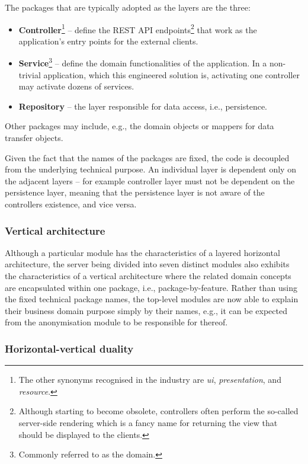 \documentclass[a4paper,twoside,12pt]{book}
\begin{document}
The packages that are typically adopted as the layers are the three:
\begin{itemize}
\item \textbf{Controller}\footnote{The other synonyms recognised in the industry are \textit{ui}, \textit{presentation}, and \textit{resource}.} -- define the REST API endpoints\footnote{Although starting to become obsolete, controllers often perform the so-called server-side rendering which is a fancy name for returning the view that should be displayed to the clients.} that work as the application's entry points for the external clients.
\item \textbf{Service}\footnote{Commonly referred to as the domain.} -- define the domain functionalities of the application. In a non-trivial application, which this engineered solution is, activating one controller may activate dozens of services.
\item \textbf{Repository} -- the layer responsible for data access, i.e., persistence.
\end{itemize}

Other packages may include, e.g., the domain objects or mappers for data transfer objects.

Given the fact that the names of the packages are fixed, the code is decoupled from the underlying technical purpose. An individual layer is dependent only on the adjacent layers -- for example controller layer must not be dependent on the persistence layer, meaning that the persistence layer is not aware of the controllers existence, and vice versa.


\subsubsection{Vertical architecture}

Although a particular module has the characteristics of a layered horizontal architecture, the server being divided into seven distinct modules also exhibits the characteristics of a vertical architecture \cite{bib:clean_architecture} where the related domain concepts are encapsulated within one package, i.e., package-by-feature. Rather than using the fixed technical package names, the top-level modules are now able to explain their business domain purpose simply by their names, e.g., it can be expected from the anonymisation module to be responsible for thereof.

\subsubsection{Horizontal-vertical duality}
\end{document}

